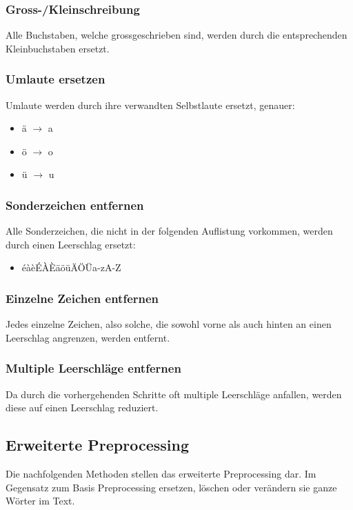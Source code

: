 \subsubsection{Gross-/Kleinschreibung}
Alle Buchstaben, welche grossgeschrieben sind, werden durch die entsprechenden Kleinbuchstaben ersetzt.
\subsubsection{Umlaute ersetzen}
Umlaute werden durch ihre verwandten Selbstlaute ersetzt, genauer:
\begin{itemize}
	\item ä $\rightarrow$ a
	\item ö $\rightarrow$ o
	\item ü $\rightarrow$ u
\end{itemize} 
\subsubsection{Sonderzeichen entfernen}
Alle Sonderzeichen, die nicht in der folgenden Auflistung vorkommen, werden durch einen Leerschlag ersetzt:
\begin{itemize}
	\item éàèÉÀÈäöüÄÖÜa-zA-Z
\end{itemize} 
\subsubsection{Einzelne Zeichen entfernen}
Jedes einzelne Zeichen, also solche, die sowohl vorne als auch hinten an einen Leerschlag angrenzen, werden entfernt.
\subsubsection{Multiple Leerschläge entfernen}
Da durch die vorhergehenden Schritte oft multiple Leerschläge anfallen, werden diese auf einen Leerschlag reduziert.
\subsection{Erweiterte Preprocessing}\label{sec:advancedpre}
Die nachfolgenden Methoden stellen das erweiterte Preprocessing dar.
Im Gegensatz zum Basis Preprocessing ersetzen, löschen oder verändern sie ganze Wörter im Text.
